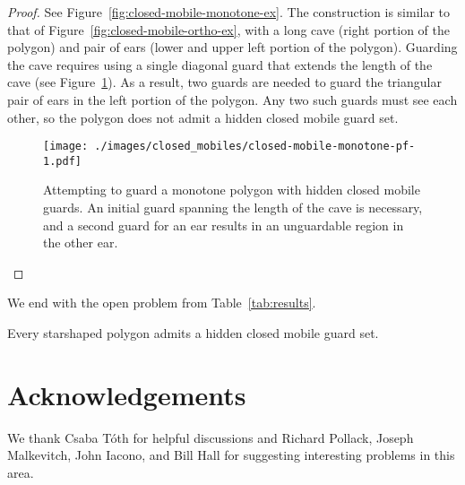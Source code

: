\documentclass{cccg12}
\begin{document}
\begin{proof}
See Figure~\ref{fig:closed-mobile-monotone-ex}.
The construction is similar to that of Figure~\ref{fig:closed-mobile-ortho-ex}, with a long cave (right portion of the polygon) and pair of ears (lower and upper left portion of the polygon).
Guarding the cave requires using a single diagonal guard that extends the length of the cave (see Figure~\ref{fig:closed-mobile-monotone-pf-1}).
As a result, two guards are needed to guard the triangular pair of ears in the left portion of the polygon.
Any two such guards must see each other, so the polygon does not admit a hidden closed mobile guard set.

\begin{figure}[ht]
\centering
\texttt{[image: ./images/closed\_mobiles/closed-mobile-monotone-pf-1.pdf]}
\caption{Attempting to guard a monotone polygon with hidden closed mobile guards.
An initial guard spanning the length of the cave is necessary, and a second guard for an ear results in an unguardable region in the other ear.}
\label{fig:closed-mobile-monotone-pf-1}
\end{figure}

\end{proof}

We end with the open problem from Table~\ref{tab:results}.

\begin{conj}
Every starshaped polygon admits a hidden closed mobile guard set.
\end{conj}

\section*{Acknowledgements}

We thank Csaba T\'{o}th for helpful discussions and Richard Pollack, Joseph Malkevitch, John Iacono, and Bill Hall for suggesting interesting problems in this area. 
\end{document}
